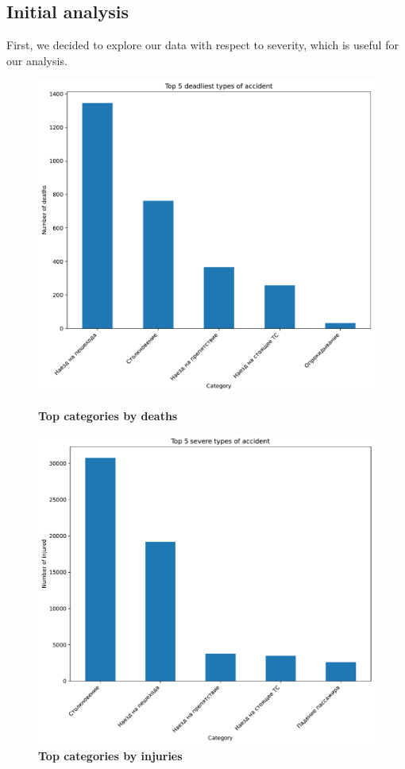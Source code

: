 \subsection{Initial analysis}
First, we decided to explore our data with respect to severity, which is useful for our analysis.
\begin{figure}[htpb!]
	\centering
	\includegraphics[width=1\textwidth]{../imgs/pdf_files/top5deaths.pdf}
	\caption{\textbf{Top categories by deaths}}
	\label{fig:top5d}
	\endminipage
	\hfill
	\centering
	\includegraphics[width=1\textwidth]{../imgs/pdf_files/top5injuries.pdf}
	\caption{\textbf{Top categories by injuries}}
	\label{fig:top5inj}
	\endminipage
\end{figure}
